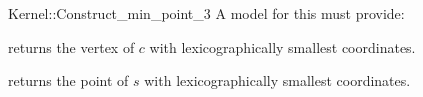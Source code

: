 \begin{ccRefFunctionObjectConcept}{Kernel::Construct_min_point_3}
A model for this must provide:


       {returns the vertex of $c$ with lexicographically smallest coordinates.}

       {returns the point of $s$ with lexicographically smallest coordinates.}


\end{ccRefFunctionObjectConcept}
